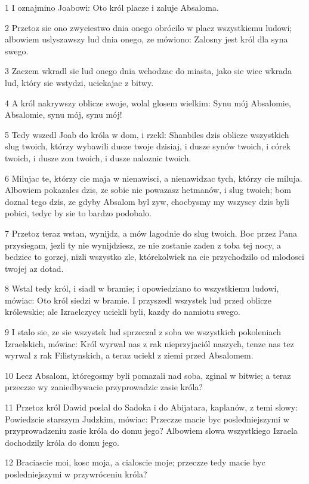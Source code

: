 \par 1 I oznajmino Joabowi: Oto król placze i zaluje Absaloma.
\par 2 Przetoz sie ono zwyciestwo dnia onego obrócilo w placz wszystkiemu ludowi; albowiem uslyszawszy lud dnia onego, ze mówiono: Zalosny jest król dla syna swego.
\par 3 Zaczem wkradl sie lud onego dnia wchodzac do miasta, jako sie wiec wkrada lud, który sie wstydzi, uciekajac z bitwy.
\par 4 A król nakrywszy oblicze swoje, wolal glosem wielkim: Synu mój Absalomie, Absalomie, synu mój, synu mój!
\par 5 Tedy wszedl Joab do króla w dom, i rzekl: Shanbiles dzis oblicze wszystkich slug twoich, którzy wybawili dusze twoje dzisiaj, i dusze synów twoich, i córek twoich, i dusze zon twoich, i dusze naloznic twoich.
\par 6 Milujac te, którzy cie maja w nienawisci, a nienawidzac tych, którzy cie miluja. Albowiem pokazales dzis, ze sobie nie powazasz hetmanów, i slug twoich; bom doznal tego dzis, ze gdyby Absalom byl zyw, chocbysmy my wszyscy dzis byli pobici, tedyc by sie to bardzo podobalo.
\par 7 Przetoz teraz wstan, wynijdz, a mów lagodnie do slug twoich. Boc przez Pana przysiegam, jezli ty nie wynijdziesz, ze nie zostanie zaden z toba tej nocy, a bedziec to gorzej, nizli wszystko zle, którekolwiek na cie przychodzilo od mlodosci twojej az dotad.
\par 8 Wstal tedy król, i siadl w bramie; i opowiedziano to wszystkiemu ludowi, mówiac: Oto król siedzi w bramie. I przyszedl wszystek lud przed oblicze królewskie; ale Izraelczycy uciekli byli, kazdy do namiotu swego.
\par 9 I stalo sie, ze sie wszystek lud sprzeczal z soba we wszystkich pokoleniach Izraelskich, mówiac: Król wyrwal nas z rak nieprzyjaciól naszych, tenze nas tez wyrwal z rak Filistynskich, a teraz uciekl z ziemi przed Absalomem.
\par 10 Lecz Absalom, któregosmy byli pomazali nad soba, zginal w bitwie; a teraz przeczze wy zaniedbywacie przyprowadzic zasie króla?
\par 11 Przetoz król Dawid poslal do Sadoka i do Abijatara, kaplanów, z temi slowy: Powiedzcie starszym Judzkim, mówiac: Przeczze macie byc posledniejszymi w przyprowadzeniu zasie króla do domu jego? Albowiem slowa wszystkiego Izraela dochodzily króla do domu jego.
\par 12 Braciascie moi, kosc moja, a cialoscie moje; przeczze tedy macie byc posledniejszymi w przywróceniu króla?
